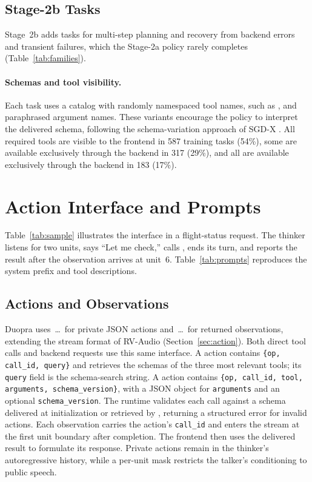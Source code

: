 \subsection{Stage-2b Tasks}

Stage~2b adds tasks for multi-step planning and recovery from backend errors and transient failures, which the Stage-2a policy rarely completes (Table~\ref{tab:families}).


\paragraph{Schemas and tool visibility.}
Each task uses a catalog with randomly namespaced tool names, such as , and paraphrased argument names.
These variants encourage the policy to interpret the delivered schema, following the schema-variation approach of SGD-X \citep{lee2022sgdx}.
All required tools are visible to the frontend in 587 training tasks (54\%), some are available exclusively through the backend in 317 (29\%), and all are available exclusively through the backend in 183 (17\%).



\section{Action Interface and Prompts}
\label{app:prompts}



Table~\ref{tab:sample} illustrates the interface in a flight-status request.
The thinker listens for two units, says ``Let me check,'' calls , ends its turn, and reports the result after the observation arrives at unit~6.
Table~\ref{tab:prompts} reproduces the system prefix and tool descriptions.

\subsection{Actions and Observations}
Duopra uses \,\dots\, for private JSON actions and \,\dots\, for returned observations, extending the stream format of RV-Audio (Section~\ref{sec:action}).
Both direct tool calls and backend requests use this same interface.
A  action contains \texttt{\{op, call\_id, query\}} and retrieves the schemas of the three most relevant tools; its \texttt{query} field is the schema-search string.
A  action contains \texttt{\{op, call\_id, tool, arguments, schema\_version\}}, with a JSON object for \texttt{arguments} and an optional \texttt{schema\_version}.
The runtime validates each call against a schema delivered at initialization or retrieved by , returning a structured error for invalid actions.
Each observation carries the action's \texttt{call\_id} and enters the stream at the first unit boundary after completion.
The frontend then uses the delivered result to formulate its response.
Private actions remain in the thinker's autoregressive history, while a per-unit mask restricts the talker's conditioning to public speech.

